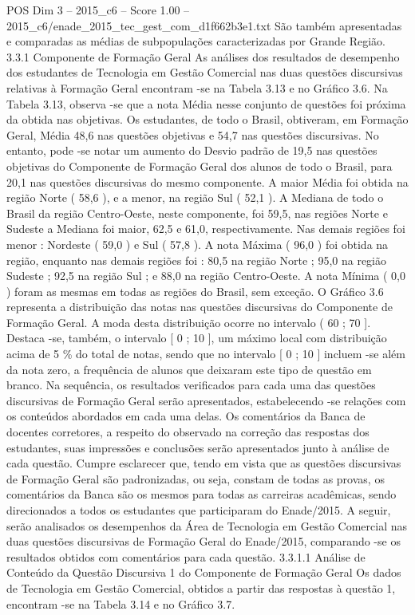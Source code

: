 \begin{textsample}{POS Dim 3 – 2015\_c6 – Score 1.00 – 2015\_c6/enade\_2015\_tec\_gest\_com\_d1f662b3e1.txt}
São também apresentadas e comparadas as médias de subpopulações caracterizadas por Grande Região. 3.3.1 Componente de Formação Geral As análises dos resultados de desempenho dos estudantes de Tecnologia em Gestão Comercial nas duas questões discursivas relativas à Formação Geral encontram -se na Tabela 3.13 e no Gráfico 3.6.
Na Tabela 3.13, observa -se que a nota Média nesse conjunto de questões foi próxima da obtida nas objetivas.
Os estudantes, de todo o Brasil, obtiveram, em Formação Geral, Média 48,6 nas questões objetivas e 54,7 nas questões discursivas.
No entanto, pode -se notar um aumento do Desvio padrão de 19,5 nas questões objetivas do Componente de Formação Geral dos alunos de todo o Brasil, para 20,1 nas questões discursivas do mesmo componente.
A maior Média foi obtida na região Norte ( 58,6 ), e a menor, na região Sul ( 52,1 ).
A Mediana de todo o Brasil da região Centro-Oeste, neste componente, foi 59,5, nas regiões Norte e Sudeste a Mediana foi maior, 62,5 e 61,0, respectivamente.
Nas demais regiões foi menor : Nordeste ( 59,0 ) e Sul ( 57,8 ).
A nota Máxima ( 96,0 ) foi obtida na região, enquanto nas demais regiões foi : 80,5 na região Norte ; 95,0 na região Sudeste ; 92,5 na região Sul ; e 88,0 na região Centro-Oeste.
A nota Mínima ( 0,0 ) foram as mesmas em todas as regiões do Brasil, sem exceção.
O Gráfico 3.6 representa a distribuição das notas nas questões discursivas do Componente de Formação Geral.
A moda desta distribuição ocorre no intervalo ( 60 ; 70 ].
Destaca -se, também, o intervalo [ 0 ; 10 ], um máximo local com distribuição acima de 5 \% do total de notas, sendo que no intervalo [ 0 ; 10 ] incluem -se além da nota zero, a frequência de alunos que deixaram este tipo de questão em branco.
Na sequência, os resultados verificados para cada uma das questões discursivas de Formação Geral serão apresentados, estabelecendo -se relações com os conteúdos abordados em cada uma delas.
Os comentários da Banca de docentes corretores, a respeito do observado na correção das respostas dos estudantes, suas impressões e conclusões serão apresentados junto à análise de cada questão.
Cumpre esclarecer que, tendo em vista que as questões discursivas de Formação Geral são padronizadas, ou seja, constam de todas as provas, os comentários da Banca são os mesmos para todas as carreiras acadêmicas, sendo direcionados a todos os estudantes que participaram do Enade/2015.
A seguir, serão analisados os desempenhos da Área de Tecnologia em Gestão Comercial nas duas questões discursivas de Formação Geral do Enade/2015, comparando -se os resultados obtidos com comentários para cada questão. 3.3.1.1 Análise de Conteúdo da Questão Discursiva 1 do Componente de Formação Geral Os dados de Tecnologia em Gestão Comercial, obtidos a partir das respostas à questão 1, encontram -se na Tabela 3.14 e no Gráfico 3.7.

\end{textsample}

